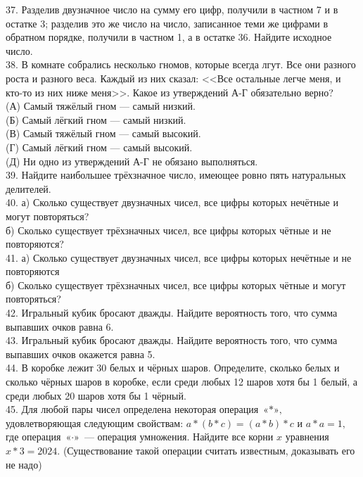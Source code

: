 37. Разделив двузначное число на сумму его цифр, получили в частном 7 и в остатке 3; разделив это же число на число, записанное теми же цифрами в обратном порядке, получили в частном 1, а в остатке 36. Найдите исходное число.\\
38. В комнате собрались несколько гномов, которые всегда лгут. Все они разного роста и разного веса. Каждый из них сказал: <<Все остальные легче меня, и кто-то из них ниже меня>>. Какое из утверждений А-Г обязательно верно?\\
(А) Самый тяжёлый гном --- самый низкий.\\
(Б) Самый лёгкий гном --- самый низкий.\\
(В) Самый тяжёлый гном --- самый высокий.\\
(Г) Самый лёгкий гном --- самый высокий.\\
(Д) Ни одно из утверждений А-Г не обязано выполняться.\\
39. Найдите наибольшее трёхзначное число, имеющее ровно пять натуральных делителей.\\
40. а) Сколько существует двузначных чисел, все цифры которых нечётные и могут повторяться?\\
б) Сколько существует трёхзначных чисел, все цифры которых чётные и не повторяются?\\
41. а) Сколько существует двузначных чисел, все цифры которых нечётные и не повторяются\\
б) Сколько существует трёхзначных чисел, все цифры которых чётные и могут повторяться?\\
42. Игральный кубик бросают дважды. Найдите вероятность того, что сумма выпавших очков равна 6.\\
43. Игральный кубик бросают дважды. Найдите вероятность того, что сумма выпавших очков окажется равна 5.\\
44. В коробке лежит 30 белых и чёрных шаров. Определите, сколько белых и сколько чёрных шаров в коробке, если среди любых 12 шаров хотя бы 1 белый, а среди любых 20 шаров хотя бы 1 чёрный.\\
45. Для любой пары чисел определена некоторая операция $\text{«$\ast$»,}$ удовлетворяющая следующим свойствам:
$a*(b*c)=(a*b)*c$ и $a*a=1,$ где операция $\text{«$\cdot$»}$ --- операция умножения. Найдите все корни $x$ уравнения
$x*3=2024.$ (Существование такой операции считать известным, доказывать его не надо)
\newpage
